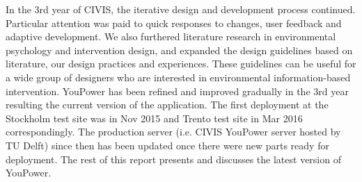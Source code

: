 In the 3rd year of CIVIS, the iterative design and development process continued. Particular attention was paid to quick responses to changes, user feedback and adaptive development. We also furthered literature research in environmental psychology and intervention design, and expanded the design guidelines based on literature, our design practices and experiences. These guidelines can be useful for a wide group of designers who are interested in environmental information-based intervention. YouPower has been refined and improved gradually in the 3rd year resulting the current version of the application. The first deployment at the Stockholm test site was in Nov 2015 and Trento test site in Mar 2016 correspondingly. The production server (i.e. CIVIS YouPower server hosted by TU Delft) since then has been updated once there were new parts ready for deployment.  
The rest of this report presents and discusses the latest version of YouPower. 

 
 

